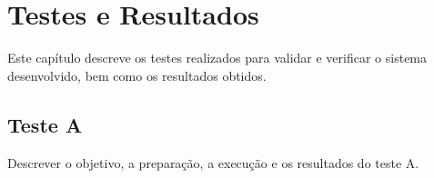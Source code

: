%

%
%
%

\chapter{Testes e Resultados}
\label{cap:testes}

Este capítulo descreve os testes realizados para validar e verificar o sistema desenvolvido, bem como os resultados obtidos.

\section{Teste A}
\label{sec:teste_a}

Descrever o objetivo, a preparação, a execução e os resultados do teste A.


